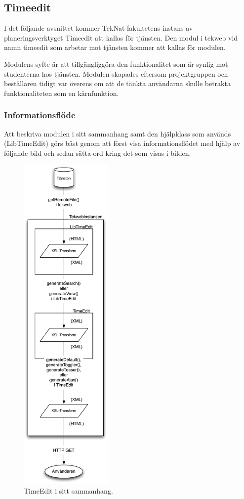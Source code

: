 \subsection{Timeedit}
I det följande avsnittet kommer TekNat-fakultetens instans av
planeringsverktyget Timeedit att kallas för tjänsten. Den modul i tekweb
vid namn timeedit som arbetar mot tjänsten kommer att kallas för
modulen.

Modulens syfte är att tillgängliggöra den funktionalitet som är synlig
mot studenterna hos tjänsten. Modulen skapades eftersom projektgruppen
och beställaren tidigt var överens om att de tänkta användarna skulle
betrakta funktionaliteten som en kärnfunktion.

\subsubsection{Informationsflöde}
Att beskriva modulen i sitt sammanhang samt den hjälpklass som används
(LibTimeEdit) görs bäst genom att först visa informationsflödet med
hjälp av följande bild och sedan sätta ord kring det som visas i bilden.

\begin{figure}
  \begin{center}
    \includegraphics[width=45mm]{timeeditchart.pdf}
  \end{center}
  \caption{TimeEdit i sitt sammanhang.}
\end{figure}


